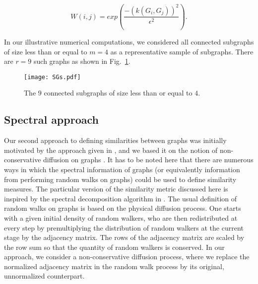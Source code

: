 \begin{equation}
  W(i,j) = exp \left( \frac{-(k(G_i,G_j))^2}{\epsilon^2} \right).
  \label{eq:sim1}
\end{equation}

In our illustrative numerical computations, we considered all
connected subgraphs of size less than or equal to $m=4$ as a
representative sample of subgraphs.
% 
There are $r=9$ such graphs as shown in Fig.~\ref{fig:SGs}.


\begin{figure}
  \begin{center}
    \texttt{[image: SGs.pdf]}
    \caption{\label{fig:SGs} The $9$ connected subgraphs of size less
      than or equal to $4$.  }
  \end{center}
\end{figure}


\subsection{\label{ss:s}Spectral approach}

Our second approach to defining similarities between graphs was
initially motivated by the approach given in \cite{Vis10graph}, and we
based it on the notion of non-conservative diffusion on graphs
\cite{Gho11non-conservative}.
% 
It has to be noted here that there are numerous ways in which the
spectral information of graphs (or equivalently information from
performing random walks on graphs) could be used to define similarity
measures.
% 
The particular version of the similarity metric discussed here is
inspired by the spectral decomposition algorithm in \cite{Vis10graph}.
% 
The usual definition of random walks on graphs is based on the
physical diffusion process.
% 
One starts with a given initial density of random walkers, who are
then redistributed at every step by premultiplying the distribution of
random walkers at the current stage by the adjacency matrix.
% 
The rows of the adjacency matrix are scaled by the row sum so that the
quantity of random walkers is conserved.
% 
In our approach, we consider a non-conservative diffusion process,
where we replace the normalized adjacency matrix in the random walk
process by its original, unnormalized counterpart.


